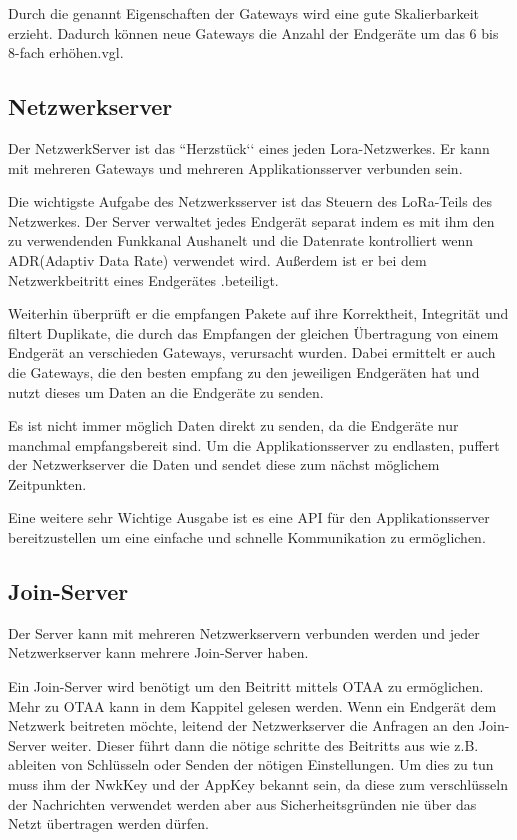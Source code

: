 \documentclass[a4paper,12pt]{article}
\begin{document}
            Durch die genannt Eigenschaften der Gateways wird eine gute Skalierbarkeit erzieht. Dadurch können neue 
            Gateways die Anzahl der Endgeräte um das 6 bis 8-fach erhöhen.vgl. \cite[S.10]{WhatIsLoRa}
        \subsection{Netzwerkserver}
            Der NetzwerkServer ist das ``Herzstück‘‘ eines jeden Lora-Netzwerkes. Er kann mit mehreren Gateways und 
            mehreren Applikationsserver verbunden sein. 

            Die wichtigste Aufgabe des Netzwerksserver ist das Steuern des LoRa-Teils des Netzwerkes. Der Server 
            verwaltet jedes Endgerät separat indem es mit ihm den zu verwendenden Funkkanal Aushanelt und die Datenrate
             kontrolliert wenn ADR(Adaptiv Data Rate) verwendet wird. Außerdem ist er bei dem Netzwerkbeitritt eines 
             Endgerätes .beteiligt.

            Weiterhin überprüft er die empfangen Pakete auf ihre Korrektheit, Integrität und filtert Duplikate, die 
            durch das Empfangen der gleichen Übertragung von einem Endgerät an verschieden Gateways, verursacht wurden.
            Dabei ermittelt er auch die Gateways, die den besten empfang zu den jeweiligen Endgeräten hat und nutzt 
            dieses um Daten an die Endgeräte zu senden.

            Es ist nicht immer möglich Daten direkt zu senden, da die Endgeräte nur manchmal empfangsbereit sind. Um 
            die Applikationsserver zu endlasten, puffert der Netzwerkserver die Daten und sendet diese zum nächst 
            möglichem Zeitpunkten.

            Eine weitere sehr Wichtige Ausgabe ist es eine API für den Applikationsserver bereitzustellen um eine 
            einfache und schnelle Kommunikation zu ermöglichen.
        \subsection{Join-Server}
            Der Server kann mit mehreren Netzwerkservern verbunden werden und jeder Netzwerkserver kann mehrere 
            Join-Server haben.

            Ein Join-Server wird benötigt um den Beitritt mittels OTAA zu ermöglichen. Mehr zu OTAA kann in dem 
            Kappitel  gelesen werden. Wenn ein Endgerät dem Netzwerk beitreten möchte, leitend 
            der Netzwerkserver die Anfragen an den Join-Server weiter. Dieser führt dann die nötige schritte des 
            Beitritts aus wie z.B. ableiten von Schlüsseln oder Senden der nötigen Einstellungen. Um dies zu tun 
            muss ihm der NwkKey und der AppKey bekannt sein, da diese zum verschlüsseln der Nachrichten verwendet 
            werden aber aus Sicherheitsgründen nie über das Netzt übertragen werden dürfen. \cite[S. 9 f.]{LoRaBack}
\end{document}
